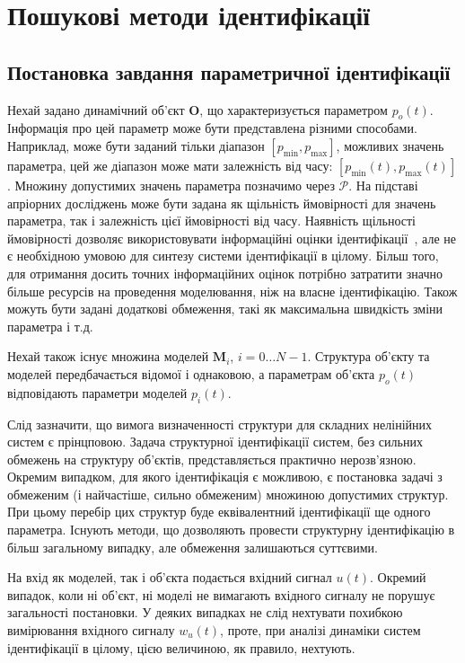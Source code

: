 \chapter{Пошукові методи ідентифікації}

\section{Постановка завдання параметричної ідентифікації} %

Нехай задано динамічний об'єкт
$ \mathbf{O} $, що характеризується параметром
$ p_o (t) $. Інформація про цей параметр може бути представлена
різними способами. Наприклад, може бути заданий тільки
діапазон
$ [p_{\min}, p_{\max}] $, можливих значень параметра, цей же діапазон може
мати залежність від часу:
$ [p_{\min} (t), p_{\max} (t)] $.
Множину допустимих
значень параметра позначимо через
$ \mathcal{P} $. На підставі апріорних досліджень може бути задана
як щільність ймовірності для значень параметра, так і
залежність цієї ймовірності від часу. Наявність щільності
ймовірності дозволяє використовувати інформаційні оцінки
ідентифікації~\cite{info_cipkin, atu_asau10}, але не є необхідною умовою
для синтезу системи ідентифікації в цілому. Більш того,
для отримання досить точних інформаційних оцінок потрібно
затратити значно більше ресурсів на проведення моделювання,
ніж на власне ідентифікацію. Також можуть бути задані додаткові
обмеження, такі як максимальна швидкість зміни параметра і т.д.

Нехай також існує множина моделей \label{atu:d:N}$\mathbf{M}_i$,
$ i = 0 \ldots N-1 $. Структура об'єкту та моделей передбачається відомої і
однаковою, а параметрам об'єкта
$p_o(t) $ відповідають параметри моделей
$p_{i}(t)$.

Слід зазначити, що вимога визначенності структури для складних
нелінійних систем є прінцповою. Задача структурної
ідентифікації систем, без сильних обмежень на структуру
об'єктів, представляється практично нерозв'язною. Окремим
випадком, для якого ідентифікація є можливою, є постановка
задачі з обмеженим (і найчастіше, сильно обмеженим) множиною
допустимих структур. При цьому перебір цих структур буде
еквівалентний ідентифікації ще одного параметра. Існують
методи, що дозволяють провести структурну ідентифікацію в
більш загальному випадку, але обмеження залишаються суттєвими.



На вхід як моделей, так і об'єкта подається вхідний сигнал
\label{atu:d:u}$u(t)$.
Окремий випадок, коли ні об'єкт, ні моделі не вимагають
вхідного сигналу не порушує загальності постановки. У деяких
випадках не слід нехтувати похибкою вимірювання вхідного
сигналу $ w_u (t) $, проте, при аналізі динаміки систем ідентифікації в
цілому, цією величиною, як правило, нехтують.

